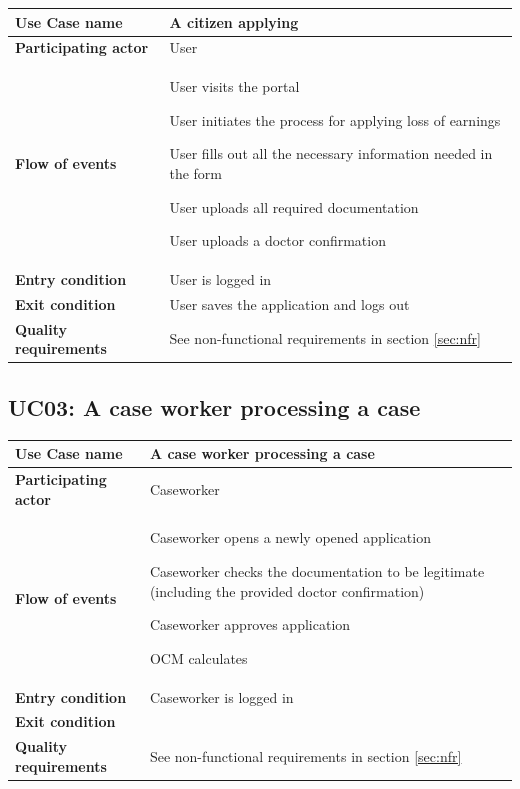 \begin{table}[htb!]
\begin{tabularx}{\textwidth}{l|X}
	\textbf{Use Case name} & A citizen applying \\
	\hline
	\textbf{Participating actor} & User\\
	\hline
	\textbf{Flow of events} & 
	    \begin{compactenum}
	        \item User visits the portal
	        \item User initiates the process for applying loss of earnings
	        \item User fills out all the necessary information needed in the form
	        \item User uploads all required documentation
	        \item User uploads a doctor confirmation
	    \end{compactenum}\\
	\hline
	\textbf{Entry condition} & User is logged in\\
	\hline
	\textbf{Exit condition} & User saves the application and logs out\\
	\hline
	\textbf{Quality requirements} & See non-functional requirements in section \ref{sec:nfr}\\
\end{tabularx}
\end{table}

\subsection{UC03: A case worker processing a case}
\begin{table}[htb!]
\begin{tabularx}{\textwidth}{l|X}
	\textbf{Use Case name} & A case worker processing a case \\
	\hline
	\textbf{Participating actor} & Caseworker\\
	\hline
	\textbf{Flow of events} & 
	    \begin{compactenum}
	        \item Caseworker opens a newly opened application
	        \item Caseworker checks the documentation to be legitimate (including the provided doctor confirmation)
	        \item Caseworker approves application
	        \item OCM calculates 
	    \end{compactenum}\\
	\hline
	\textbf{Entry condition} & Caseworker is logged in\\
	\hline
	\textbf{Exit condition} & \\
	\hline
	\textbf{Quality requirements} & See non-functional requirements in section \ref{sec:nfr}\\
\end{tabularx}
\end{table}